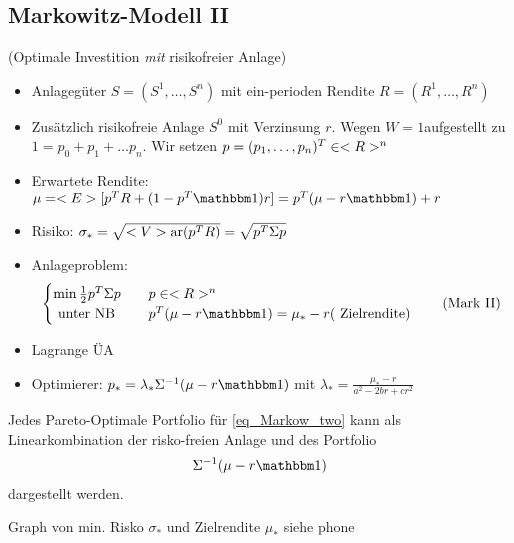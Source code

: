 \subsection*{Markowitz-Modell II}
(Optimale Investition \emph{mit} risikofreier Anlage)\\
\begin{itemize}
	\item Anlagegüter $S = (S^1, \dots, S^n)$ mit ein-perioden Rendite $R = (R^1, \dots, R^n)$
	\item Zusätzlich risikofreie Anlage $S^0$ mit Verzinsung $r$. Wegen $W=1$aufgestellt zu $1 = p_0 + p_1 + \dots p_n$. Wir setzen $p = (p_1,\dots, p_n)^T \in <R>^n$
	\item Erwartete Rendite: $\mu = \E[p^T R + (1-p^T \indi)r] = p^T(\mu - r\indi) + r$
	\item Risiko: $\sigma_{\ast} = \sqrt{<V>\text{ar}(p^T R)} = \sqrt{p^T \Sigma p}$
	\item Anlageproblem:
	\begin{align*}
		\begin{cases}
			\min \half p^T \Sigma p & \quad p \in \R^n\\
			\text{ unter NB} &\quad p^T (\mu-r\indi) = \mu_{\ast} -r (\text{ Zielrendite})\\
		\end{cases}\tag{Mark II}\label{eq_Markow_two}
	\end{align*}
	\item Lagrange ÜA
	\item Optimierer: $p_{\ast} = \lambda_{\ast}\Sigma^{-1}(\mu - r \indi)$ mit $\lambda_{\ast} = \frac{\mu_{\ast} - r}{a^2 - 2br + cr^2}$
\end{itemize}
\begin{conclusion}
	Jedes Pareto-Optimale Portfolio für \eqref{eq_Markow_two} kann als Linearkombination der risko-freien Anlage und des Portfolio
	\begin{align*}
		\Sigma^{-1}(\mu -r\indi)
	\end{align*}
	dargestellt werden.
\end{conclusion}
Graph von min. Risko $\sigma_{\ast}$ und Zielrendite $\mu_{\ast}$
siehe phone
